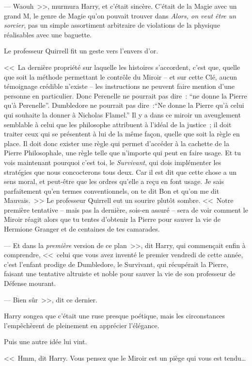 --- Waouh~>>, murmura Harry, et c'était sincère. C'était de la Magie avec un grand M, le genre de Magie qu'on pouvait trouver dans \emph{Alors, on veut être un sorcier}, pas un simple assortiment arbitraire de violations de la physique réalisables avec une baguette.

Le professeur Quirrell fit un geste vers l'envers d'or.

<<~La dernière propriété sur laquelle les histoires s'accordent, c'est que, quelle que soit la méthode permettant le contrôle du Miroir -- et sur cette Clé, aucun témoignage crédible n'existe -- les instructions ne peuvent faire mention d'une personne en particulier. Donc Perenelle ne pourrait pas dire~: “ne donne la Pierre qu'à Perenelle”. Dumbledore ne pourrait pas dire~:“Ne donne la Pierre qu'à celui qui souhaite la donner à Nicholas Flamel.” Il y a dans ce miroir un aveuglement semblable à celui que les philosophe attribuent à l'idéal de la justice~; il doit traiter ceux qui se présentent à lui de la même façon, quelle que soit la règle en place. Il doit donc exister une règle qui permet d'accéder à la cachette de la Pierre Philosophale, une règle telle que n'importe qui peut en faire usage. Et tu vois maintenant pourquoi c'est toi, le \emph{Survivant}, qui dois implémenter les stratégies que nous concocterons tous deux. Car il est dit que cette chose a un sens moral, et peut-être que les ordres qu'elle a reçu en font usage. Je sais parfaitement qu'en termes conventionnels, on te dit Bon et qu'on me dit Mauvais.~>> Le professeur Quirrell eut un sourire plutôt sombre. <<~Notre première tentative -- mais pas la dernière, sois-en assuré -- sera de voir comment le Miroir réagit alors que tu tentes d'obtenir la Pierre pour sauver la vie de Hermione Granger et de centaines de tes camarades.

--- Et dans la \emph{première} version de ce plan~>>, dit Harry, qui commençait enfin à comprendre, <<~celui que vous avez inventé le premier vendredi de cette année, c'est l'enfant prodige de Dumbledore, le Survivant, qui récupérait la Pierre, faisant une tentative altruiste et noble pour sauver la vie de son professeur de Défense mourant.

--- Bien sûr~>>, dit ce dernier.

Harry songea que c'était une ruse presque poétique, mais les circonstances l'empêchèrent de pleinement en apprécier l'élégance.

Puis une autre idée lui vint.

<<~Hmm, dit Harry. Vous pensez que le Miroir est un piège qui vous est tendu…

